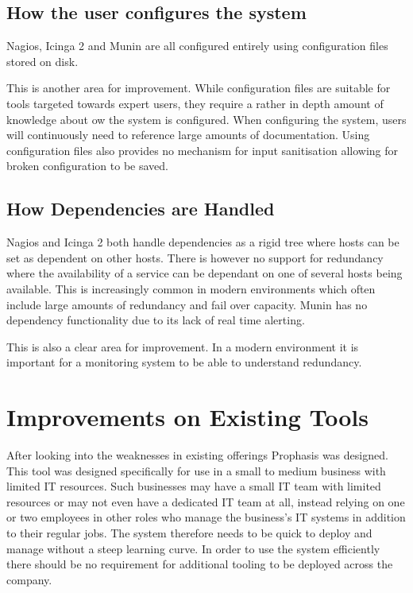 \documentclass[bsc,logo,twoside,parskip,singlespacing,notimes]{infthesis}
\begin{document}
\subsection{How the user configures the system}

	Nagios, Icinga 2 and Munin are all configured entirely using configuration
	files stored on disk.


	This is another area for improvement. While configuration files are suitable
	for tools targeted towards expert users, they require a rather in depth amount
	of knowledge about ow the system is configured.  When configuring the system,
	users will continuously need to reference large amounts of documentation. Using
	configuration files also provides no mechanism for input sanitisation allowing
	for broken configuration to be saved.

\subsection{How Dependencies are Handled}

	Nagios and Icinga 2 both handle dependencies as a rigid tree where hosts can
	be set as dependent on other hosts.  There is however no support for redundancy
	where the availability of a service can be dependant on one of several hosts
	being available. This is increasingly common in modern environments which often
	include large amounts of redundancy and fail over capacity. Munin has no
	dependency functionality due to its lack of real time alerting.


	This is also a clear area for improvement. In a modern environment it is
	important for a monitoring system to be able to understand redundancy.

\section{Improvements on Existing Tools} %

	After looking into the weaknesses in existing offerings	Prophasis was designed.
	This tool was designed specifically for use in a small to medium business with limited IT
	resources.  Such businesses may have a small IT team with limited resources or may not
	even have a dedicated IT team at all, instead relying on one or two employees
	in other roles who manage the business's IT systems in addition to their
	regular jobs. The system therefore needs to be quick to deploy and manage without
	a steep learning curve. In order to use the system efficiently there should
	be no requirement for additional tooling to be deployed across the company.
\end{document}
